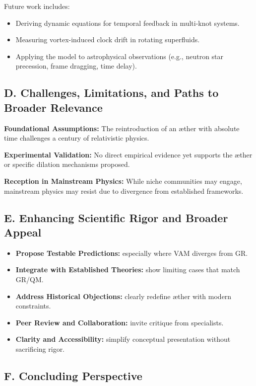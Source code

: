 Future work includes:
\begin{itemize}
    \item Deriving dynamic equations for temporal feedback in multi-knot systems.
    \item Measuring vortex-induced clock drift in rotating superfluids.
    \item Applying the model to astrophysical observations (e.g., neutron star precession, frame dragging, time delay).
\end{itemize}

\subsection*{D. Challenges, Limitations, and Paths to Broader Relevance}

\textbf{Foundational Assumptions:} The reintroduction of an æther with absolute time challenges a century of relativistic physics.

\textbf{Experimental Validation:} No direct empirical evidence yet supports the æther or specific dilation mechanisms proposed.

\textbf{Reception in Mainstream Physics:} While niche communities may engage, mainstream physics may resist due to divergence from established frameworks.

\subsection*{E. Enhancing Scientific Rigor and Broader Appeal}

\begin{itemize}
    \item \textbf{Propose Testable Predictions:} especially where VAM diverges from GR.
    \item \textbf{Integrate with Established Theories:} show limiting cases that match GR/QM.
    \item \textbf{Address Historical Objections:} clearly redefine æther with modern constraints.
    \item \textbf{Peer Review and Collaboration:} invite critique from specialists.
    \item \textbf{Clarity and Accessibility:} simplify conceptual presentation without sacrificing rigor.
\end{itemize}

\subsection*{F. Concluding Perspective}

